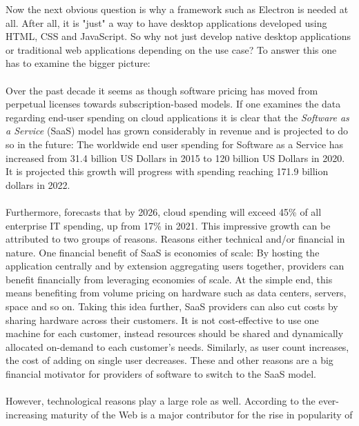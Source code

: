 Now the next obvious question is why a framework such as Electron is needed at all.
After all, it is "just" a way to have desktop applications developed using HTML, CSS and JavaScript.
So why not just develop native desktop applications or traditional web applications depending on the use case?
To answer this one has to examine the bigger picture:\paragraph{}
Over the past decade it seems as though software pricing has moved from perpetual licenses towards subscription-based
models.
If one examines the data regarding end-user spending on cloud applications it is clear that the
\emph{Software as a Service} (SaaS) model has grown considerably in revenue and is projected to do so in the future:
The worldwide end user spending for Software as a Service has increased from 31.4 billion US Dollars in 2015 to 120
billion US Dollars in 2020.
It is projected this growth will progress with spending reaching 171.9 billion dollars in 2022. \parencite{gartner2021}\paragraph{}
Furthermore, \textcite{gartner2021} forecasts that by 2026, cloud spending will exceed 45\% of all enterprise IT spending, up from
17\% in 2021.
This impressive growth can be attributed to two groups of reasons.
Reasons either technical and/or financial in nature.
One financial benefit of SaaS is economies of scale:
By hosting the application centrally and by extension aggregating users together, providers can benefit financially from
leveraging economies of scale.
At the simple end, this means benefiting from volume pricing on hardware such as data centers, servers, space and so on.
Taking this idea further, SaaS providers can also cut costs by sharing hardware across their customers.
It is not cost-effective to use one machine for each customer, instead resources should be shared and dynamically
allocated on-demand to each customer's needs.
Similarly, as user count increases, the cost of adding on single user decreases.
These and other reasons are a big financial motivator for providers of software to switch to the SaaS model. \parencite{jacobs2005}\paragraph{}
However, technological reasons play a large role as well.
According to \textcite{jacobs2005} the ever-increasing maturity of the Web is a major contributor for the rise in popularity of
